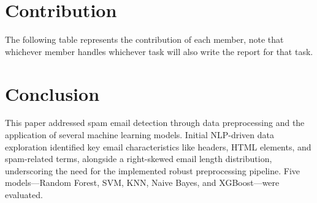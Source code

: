 \documentclass[conference]{IEEEtran}
\begin{document}
    \section{Contribution}
    \label{sec:contribution}

    The following table represents the contribution of each member, note that whichever member handles whichever task will also write the report for that task.

    \begin{table}[h]
        \centering
        \caption{Members Contributions}
        \setlength{\tabcolsep}{2pt} %
        \renewcommand{\arraystretch}{1} %
        \label{tab:contributions}
    \end{table}


    \section{Conclusion}
    \label{sec:conclusion}
    This paper addressed spam email detection through data preprocessing and the application of several machine learning models.
    Initial NLP-driven data exploration identified key email characteristics like headers, HTML elements, and spam-related terms, alongside a right-skewed email length distribution, underscoring the need for the implemented robust preprocessing pipeline.
    Five models—Random Forest, SVM, KNN, Naive Bayes, and XGBoost—were evaluated.
\end{document}
